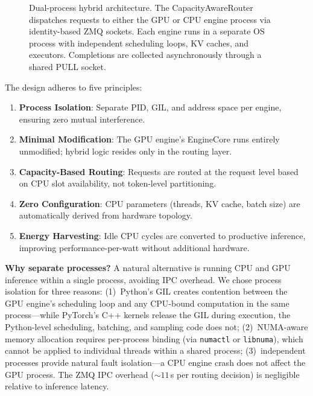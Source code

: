 \documentclass[10pt,conference]{IEEEtran}
\begin{document}
\begin{figure}[t]
{%
}
\caption{Dual-process hybrid architecture. The CapacityAwareRouter dispatches requests to either the GPU or CPU engine process via identity-based ZMQ sockets. Each engine runs in a separate OS process with independent scheduling loops, KV caches, and executors. Completions are collected asynchronously through a shared PULL socket.}
\label{fig:architecture}
\end{figure}

The design adheres to five principles:

\begin{enumerate}
\item \textbf{Process Isolation}: Separate PID, GIL, and address space per engine, ensuring zero mutual interference.
\item \textbf{Minimal Modification}: The GPU engine's EngineCore runs entirely unmodified; hybrid logic resides only in the routing layer.
\item \textbf{Capacity-Based Routing}: Requests are routed at the request level based on CPU slot availability, not token-level partitioning.
\item \textbf{Zero Configuration}: CPU parameters (threads, KV cache, batch size) are automatically derived from hardware topology.
\item \textbf{Energy Harvesting}: Idle CPU cycles are converted to productive inference, improving performance-per-watt without additional hardware.
\end{enumerate}

\textbf{Why separate processes?}
A natural alternative is running CPU and GPU inference within a single process, avoiding IPC overhead.
We chose process isolation for three reasons: (1)~Python's GIL creates contention between the GPU engine's scheduling loop and any CPU-bound computation in the same process---while PyTorch's C++ kernels release the GIL during execution, the Python-level scheduling, batching, and sampling code does not;
(2)~NUMA-aware memory allocation requires per-process binding (via \texttt{numactl} or \texttt{libnuma}), which cannot be applied to individual threads within a shared process;
(3)~independent processes provide natural fault isolation---a CPU engine crash does not affect the GPU process.
The ZMQ IPC overhead (${\sim}11$\,\textmu{}s per routing decision) is negligible relative to inference latency.
\end{document}
